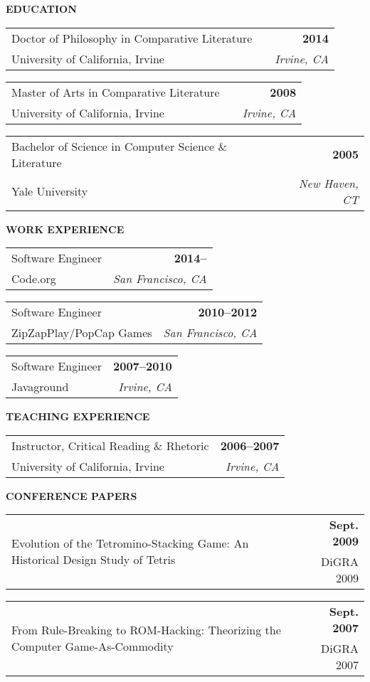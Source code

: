 
\textbf{EDUCATION}

\newcommand{\newdegree}[4]{
	\begin{tabularx}{\textwidth}{@{}lXr@{}}
		{#1} & &\textbf{#2} \\
		{#3} & &\emph{#4}
	\end{tabularx}
}

\newdegree{Doctor of Philosophy in Comparative Literature}{2014}{University of California, Irvine}{Irvine, CA}

\newdegree{Master of Arts in Comparative Literature}{2008}{University of California, Irvine}{Irvine, CA}

\newdegree{Bachelor of Science in Computer Science \& Literature}{2005}{Yale University}{New Haven, CT}

\textbf{WORK EXPERIENCE}

\newcommand{\newwork}[4]{
  \begin{tabularx}{\textwidth}{@{}Xr@{}}
    {#1} & \textbf{#2} \\
    {#3} & \emph{#4}
  \end{tabularx}
}

\newwork{Software Engineer}{2014--}{Code.org}{San Francisco, CA}
\newwork{Software Engineer}{2010--2012}{ZipZapPlay/PopCap Games}{San Francisco, CA}
\newwork{Software Engineer}{2007--2010}{Javaground}{Irvine, CA}

\textbf{TEACHING EXPERIENCE}

\newcommand{\newteach}[4]{
  \begin{tabularx}{\textwidth}{@{}Xr@{}}
    {#1} & \textbf{#2} \\
    {#3} & \emph{#4}
  \end{tabularx}
}

\newteach{Instructor, Critical Reading \& Rhetoric}{2006--2007}{University of California, Irvine}{Irvine, CA}

\newcommand{\mypubentry}[3]{
	\begin{tabularx}{\textwidth}{@{}lXr@{}}
		\multirow{2}{.7\textwidth}{#1} && \textbf{#2} \\ 
		&& #3
    \vspace{6pt}
	\end{tabularx}
}

\textbf{CONFERENCE PAPERS}

\mypubentry{Evolution of the Tetromino-Stacking Game: An Historical Design Study of Tetris}{Sept. 2009}{DiGRA 2009}
  \mypubentry{From Rule-Breaking to ROM-Hacking: Theorizing the Computer Game-As-Commodity}{Sept. 2007}{DiGRA 2007}
\vspace{12pt}
